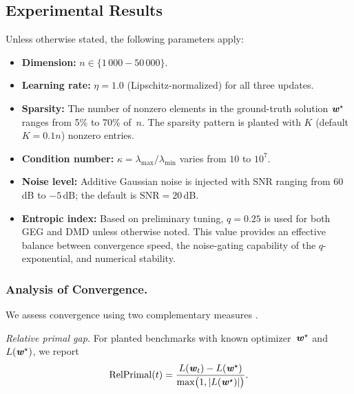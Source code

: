 \documentclass[10pt]{amsart}
\newcommand{\bi}[1]{\textbf{\textit{#1}}}
\theoremstyle{definition}
\theoremstyle{definition}	 %
\begin{document}
\subsection{Experimental Results}\label{ssec:results}

Unless otherwise stated, the following parameters apply:
\begin{itemize}
  \item \textbf{Dimension:} $n\in\{1\,000 - 50\,000\}$.
  \item \textbf{Learning rate:}
        $\eta=1.0$ (Lipschitz-normalized) for all three updates.
  \item \textbf{Sparsity:}
        The number of nonzero elements in the ground-truth solution
        $\bi w^\star$ ranges from 5\% to 70\% of~$n$. The sparsity pattern is planted with $K$  (default $K = 0.1n$) nonzero entries.
  \item \textbf{Condition number:}
        $\kappa=\lambda_{\max}/\lambda_{\min}$ varies from
        $10$ to $10^7$.
  \item \textbf{Noise level:}
        Additive Gaussian noise is injected with SNR ranging from
        $60$\,dB to $-5$\,dB; the default is $\mathrm{SNR}=20$\,dB.
  \item \textbf{Entropic index:}
        Based on preliminary tuning, $q=0.25$ is used for both GEG
        and DMD unless otherwise noted.  This value provides an
        effective balance between convergence speed, the noise-gating
        capability of the $q$-exponential, and numerical stability.
\end{itemize}

\subsubsection{Analysis of Convergence.}
We assess convergence using two complementary measures \cite{Jaggi2013,Bach2015}.

\emph{Relative primal gap.}
For planted benchmarks with known optimizer~$\bi w^\star$ and
$L(\bi w^\star)$, we report
\begin{equation}\label{eq:relprim}
  \mathrm{RelPrimal}(t)
  =\frac{L(\bi w_t)-L(\bi w^\star)}
       {\max \bigl(1,|L(\bi w^\star)|\bigr)}.
\end{equation}
\end{document}
